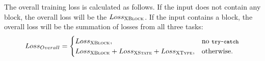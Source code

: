 The overall training loss is calculated as follows. If the input does
not contain any  block, the overall loss will be the 
$Loss_{{\textsc{XBlock}}}$. If the input contains a  block,
the overall loss will be the summation of losses from all
three tasks:
\begin{equation}
\label{eqn:loss}
Loss_{Overall} =
\begin{cases}
Loss_{{\textsc{XBlock}}},  & \text{no {\footnotesize\texttt{try-catch}}}\\
Loss_{{\textsc{XBlock}}} + Loss_{{\textsc{XState}}} + Loss_{{\textsc{XType}}}, &\text{otherwise.}
\end{cases}
\end{equation}

